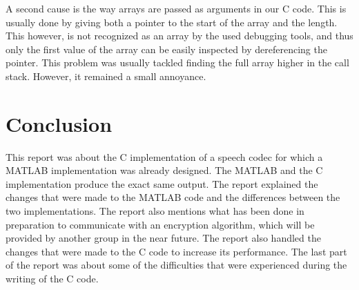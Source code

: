 \documentclass[a4paper]{article}
\begin{document}
A second cause is the way arrays are passed as arguments in our C code. This is usually done by giving both a pointer to the start of the array and the length. This however, is not recognized as an array by the used debugging tools, and thus only the first value of the array can be easily inspected by dereferencing the pointer. This problem was usually tackled finding the full array higher in the call stack. However, it remained a small annoyance.

\section{Conclusion}
This report was about the C implementation of a speech codec for which a MATLAB implementation was already designed. The MATLAB and the C implementation produce the exact same output. The report explained the changes that were made to the MATLAB code and the differences between the two implementations. The report also mentions what has been done in preparation to communicate with an encryption algorithm, which will be provided by another group in the near future. The report also handled the changes that were made to the C code to increase its performance. The last part of the report was about some of the difficulties that were experienced during the writing of the C code.
\end{document}
